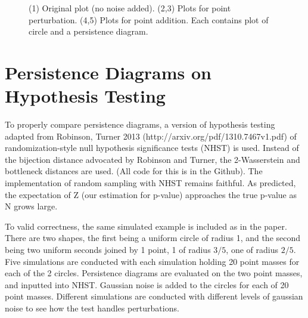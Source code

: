 \documentclass[a4paper]{article}
\begin{document}
\begin{figure}[htp!]
\begin{subfigure}{.20\textwidth}
\end{subfigure}
\caption{(1) Original plot (no noise added). (2,3) Plots for point perturbation. (4,5) Plots for point addition. Each contains plot of circle and a persistence diagram.}
\end{figure}

\section{Persistence Diagrams on Hypothesis Testing}
To properly compare persistence diagrams, a version of hypothesis testing adapted from Robinson, Turner 2013 (http://arxiv.org/pdf/1310.7467v1.pdf) of  randomization-style null hypothesis significance tests (NHST) is used. Instead of the bijection distance advocated by Robinson and Turner, the 2-Wasserstein and bottleneck distances are used. (All code for this is in the Github). The implementation of random sampling with NHST remains faithful. As predicted, the expectation of Z (our estimation for p-value) approaches the true p-value as N grows large.

To valid correctness, the same simulated example is included as in the paper. There are two shapes, the first being a uniform circle of radius 1, and the second being two uniform seconds joined by 1 point, 1 of radius $3/5$, one of radius $2/5$. Five simulations are conducted with each simulation holding 20 point masses for each of the 2 circles. Persistence diagrams are evaluated on the two point masses, and inputted into NHST. Gaussian noise is added to the circles for each of 20 point masses. Different simulations are conducted with different levels of gaussian noise to see how the test handles perturbations. 
\end{document}
